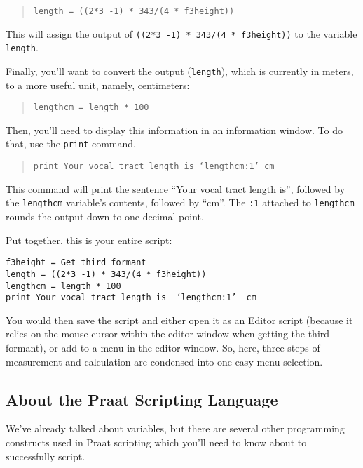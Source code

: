 \begin{quote}
\texttt{length = ((2*3 -1) * 343/(4 * f3height))}
\end{quote}

This will assign the output of \texttt{((2*3 -1) * 343/(4 * f3height))}
to the variable \texttt{length}.

Finally, you'll want to convert the output (\texttt{length}), which is
currently in meters, to a more useful unit, namely, centimeters:

\begin{quote}
\texttt{lengthcm = length * 100}
\end{quote}

Then, you'll need to display this information in an information window.
To do that, use the \texttt{print} command.

\begin{quote}
\texttt{print Your vocal tract length is  ‘lengthcm:1’  cm}
\end{quote}

This command will print the sentence ``Your vocal tract length is'',
followed by the \texttt{lengthcm} variable's contents, followed by
``cm''. The \texttt{:1} attached to \texttt{lengthcm} rounds the output
down to one decimal point.

Put together, this is your entire script:

\begin{verbatim} 
f3height = Get third formant
length = ((2*3 -1) * 343/(4 * f3height))
lengthcm = length * 100
print Your vocal tract length is  ‘lengthcm:1’  cm
\end{verbatim}

You would then save the script and either open it as an Editor script
(because it relies on the mouse cursor within the editor window when
getting the third formant), or add to a menu in the editor window. So,
here, three steps of measurement and calculation are condensed into one
easy menu selection.

\hypertarget{about-the-praat-scripting-language}{%
\subsection{About the Praat Scripting
Language}\label{about-the-praat-scripting-language}}

We've already talked about variables, but there are several other
programming constructs used in Praat scripting which you'll need to know
about to successfully script.

